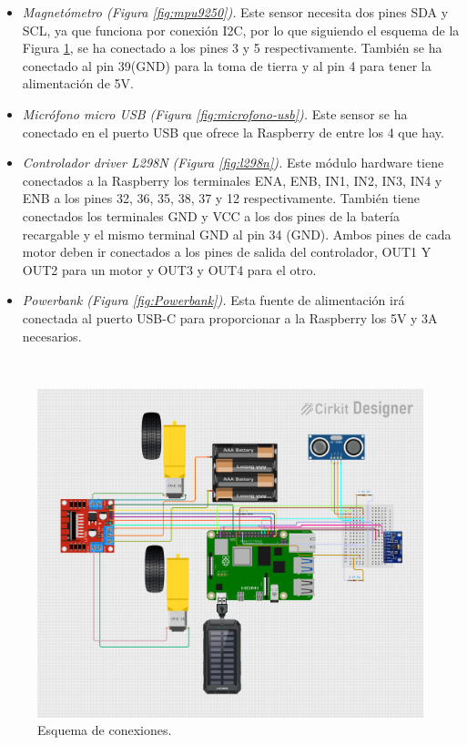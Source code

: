 \begin{itemize}
 \item \textit{Magnetómetro (Figura \ref{fig:mpu9250}).} Este sensor necesita dos pines SDA y SCL, ya que funciona por conexión I2C, por lo que siguiendo el esquema de la Figura \ref{fig:circuito}, se ha conectado a los pines 3 y 5 respectivamente. También se ha conectado al pin 39(GND) para la toma de tierra y al pin 4 para tener la alimentación de  5V. 
 \item \textit{Micrófono micro USB (Figura \ref{fig:microfono-usb}).} Este sensor se ha conectado en el puerto USB que ofrece la Raspberry de entre los 4 que hay.
 \item \textit{Controlador driver L298N (Figura \ref{fig:l298n}).} Este módulo hardware tiene conectados a la Raspberry los terminales ENA, ENB, IN1, IN2, IN3, IN4 y ENB a los pines 32, 36, 35, 38, 37 y 12 respectivamente. También tiene conectados los terminales GND y VCC a los dos pines de la batería recargable y el mismo terminal GND al pin 34 (GND). Ambos pines de cada motor deben ir conectados a los pines de salida del controlador, OUT1 Y OUT2 para un motor y OUT3 y OUT4 para el otro.
 \item \textit{Powerbank (Figura \ref{fig:Powerbank}).} Esta fuente de alimentación irá conectada al puerto USB-C para proporcionar a la Raspberry los 5V y 3A necesarios.
\end{itemize}\


\begin{figure}[H]
  \centering
  \includegraphics[scale=0.5]{figs/final_circuito} %
  \caption{Esquema de conexiones.}
  \label{fig:circuito}
\end{figure}

